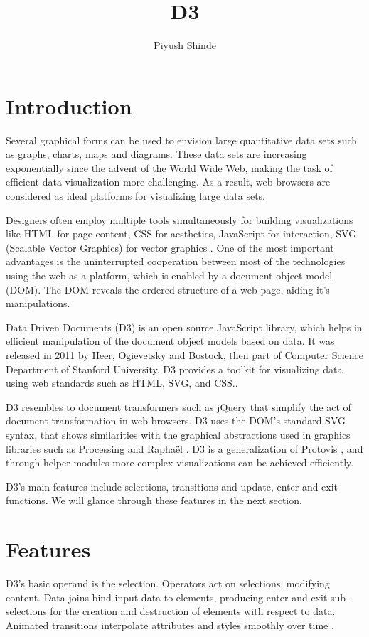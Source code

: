 \documentclass[9pt,twocolumn,twoside]{styles/osajnl}
\title{D3}
\author[1,*]{Piyush Shinde}
\affil[1]{School of Informatics and Computing, Bloomington, IN 47408, U.S.A.}
\affil[*]{Corresponding authors: piyushsshinde1992@gmail.com}
\begin{document}
\maketitle

\section{Introduction}

Several graphical forms can be used to envision large quantitative data sets such as graphs, charts, maps and diagrams. These data sets are increasing exponentially since the advent of the World Wide Web, making the task of efficient data visualization more challenging. As a result, web browsers are considered as ideal platforms for visualizing large data sets.

Designers often employ multiple tools simultaneously for building visualizations like HTML for page content, CSS for aesthetics, JavaScript for interaction, SVG (Scalable Vector Graphics) for vector graphics \cite{paper-d3}. One of the most important advantages is the uninterrupted cooperation between most of the technologies using the web as a platform, which is enabled by a document object model (DOM). The DOM reveals the ordered structure of a web page, aiding it's manipulations.  

Data Driven Documents (D3) is an open source JavaScript library, which helps in efficient manipulation of the document object models based on data. It was released in 2011 by Heer, Ogievetsky and Bostock, then part of Computer Science Department of Stanford University. D3 provides a toolkit for visualizing data using web standards such as HTML, SVG, and CSS.\cite{www-git}. 

D3 resembles to document transformers such as jQuery \cite{www-jquery} that simplify the act of document transformation in web browsers. D3 uses the DOM’s standard SVG syntax, that shows similarities with the graphical abstractions used in graphics libraries such as Processing and Raphaël \cite{www-raphael}. D3 is a generalization of Protovis \cite{www-protovis}, and through helper modules more complex visualizations can be  achieved efficiently. 

D3's main features include selections, transitions and update, enter and exit functions. We will glance through these features in the next section.

\section{Features}
D3’s basic operand is the selection. Operators act on selections, modifying content. Data joins bind input data to elements, producing enter and exit sub-selections for the creation and destruction of elements with respect to data. Animated transitions interpolate attributes and styles smoothly over time \cite{paper-d3}.
 
\end{document}
